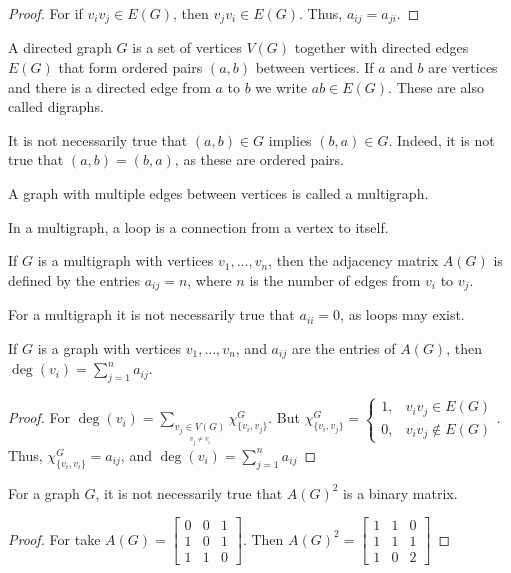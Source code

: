 \documentclass[crop=false,class=book,oneside]{standalone}
\begin{document}
\begin{proof}
For if $v_iv_j \in E(G)$, then $v_j v_i \in E(G)$. Thus, $a_{ij} = a_{ji}$.
\end{proof}
\begin{definition}
A directed graph $G$ is a set of vertices $V(G)$ together with directed edges $E(G)$ that form ordered pairs $(a,b)$ between vertices. If $a$ and $b$ are vertices and there is a directed edge from $a$ to $b$ we write $ab \in E(G)$. These are also called digraphs.
\end{definition}
\begin{remark}
It is not necessarily true that $(a,b) \in G$ implies $(b,a) \in G$. Indeed, it is not true that $(a,b) = (b,a)$, as these are ordered pairs.
\end{remark}
\begin{definition}
A graph with multiple edges between vertices is called a multigraph.
\end{definition}
\begin{definition}
In a multigraph, a loop is a connection from a vertex to itself.
\end{definition}
\begin{definition}
If $G$ is a multigraph with vertices $v_1,\hdots, v_n$, then the adjacency matrix $A(G)$ is defined by the entries $a_{ij} = n$, where $n$ is the number of edges from $v_i$ to $v_j$. 
\end{definition}
\begin{remark}
For a multigraph it is not necessarily true that $a_{ii}=0$, as loops may exist.
\end{remark}
\begin{corollary}
If $G$ is a graph with vertices $v_1,\hdots, v_n$, and $a_{ij}$ are the entries of $A(G)$, then $\deg(v_i) = \sum_{j=1}^{n} a_{ij}$.
\end{corollary}
\begin{proof}
For $\deg(v_i) = \sum_{\underset{v_j\ne v_i}{v_j\in V(G)}}\chi_{\{v_i,v_j\}}^G$. But $\chi_{\{v_i,v_j\}}^G = \begin{cases} 1, & v_iv_j\in E(G)\\ 0, & v_iv_j \notin E(G)\end{cases}$. Thus, $\chi_{\{v_i,v_i\}}^G = a_{ij}$, and $\deg(v_i) = \sum_{j=1}^{n} a_{ij}$
\end{proof}
\begin{theorem}
For a graph $G$, it is not necessarily true that $A(G)^2$ is a binary matrix.
\end{theorem}
\begin{proof}
For take $A(G) = \begin{bmatrix} 0 & 0 & 1 \\ 1 & 0 & 1 \\ 1& 1 & 0 \end{bmatrix}$. Then $A(G)^2 = \begin{bmatrix} 1 & 1 & 0 \\ 1 & 1 & 1 \\ 1 & 0 & 2 \end{bmatrix}$
\end{proof}
\end{document}
